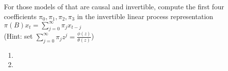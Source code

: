 For those models of  that are causal and invertible, compute the first four coefficients $\pi_0, \pi_1, \pi_2, \pi_3$ in the invertible linear process representation $\pi(B)x_t = \sum_{j=0}^{\infty}\pi_j x_{t-j}$
\\(Hint: set $\sum_{j=0}^{\infty} \pi_j z^j = \frac{\phi(z)}{\theta(z)}$)

\begin{enumerate}[label=(\alph*)]
    \item \setcounter{enumi}{2}
    \item 
\end{enumerate}